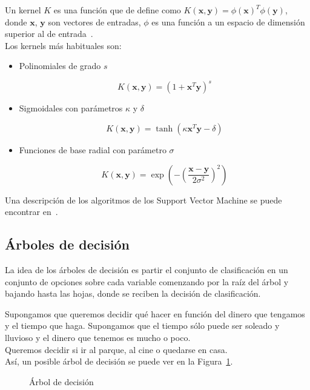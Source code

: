 Un kernel $K$ es una función que de define como $K(\mathbf{x}, \mathbf{y}) = \phi(\mathbf{x})^T \phi(\mathbf{y})$, donde $\mathbf{x}$, $\mathbf{y}$ son vectores de entradas, $\phi$ es una función a un espacio de dimensión superior al de entrada~\cite[pág 117]{Marsland:2009:MLA:1571643}.\\

Los kernels más habituales son:

\begin{itemize}
	\item Polinomiales de grado $s$
	
	\begin{equation}
	K(\mathbf{x},\mathbf{y}) = (1 + \mathbf{x}^T \mathbf{y})^s
	\end{equation}
	
	\item Sigmoidales con parámetros $\kappa$ y $\delta$
	
	\begin{equation}
	K(\mathbf{x}, \mathbf{y}) = \tanh(\kappa \mathbf{x}^T\mathbf{y} - \delta)
	\end{equation}
	
	\item Funciones de base radial con parámetro $\sigma$
	
	\begin{equation}
	K(\mathbf{x}, \mathbf{y}) = \exp\left(-\left(\dfrac{\mathbf{x} - \mathbf{y}}{2\sigma^2}\right)^2\right)
	\end{equation}
\end{itemize}

Una descripción de los algoritmos de los Support Vector Machine se puede encontrar en~\cite{Cristianini:1999:ISV:345662}.

\subsection{Árboles de decisión}

La idea de los árboles de decisión es partir el conjunto de clasificación en un conjunto de opciones sobre cada variable comenzando por la raíz del árbol y bajando hasta las hojas, donde se reciben la decisión de clasificación. \\

\begin{ejemplo}
Supongamos que queremos decidir qué hacer en función del dinero que tengamos y el tiempo que haga. Supongamos que el tiempo sólo puede ser soleado y lluvioso y el dinero que tenemos es mucho o poco.\\

Queremos decidir si ir al parque, al cine o quedarse en casa.\\

Así, un posible árbol de decisión se puede ver en la Figura~\ref{fig:arboldecision}.

\begin{figure}[htbp!]
	\centering
	\arboldedecision
	\caption{Árbol de decisión}
	\label{fig:arboldecision}
\end{figure}
\end{ejemplo}

